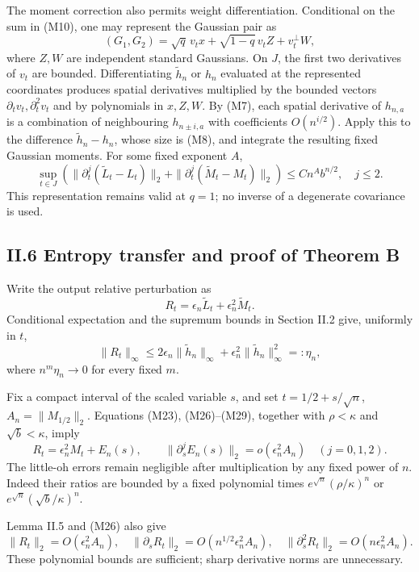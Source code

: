 \documentclass[
  british,
  10pt,
]{article}
\begin{document}
The moment correction also permits weight differentiation. Conditional
on the sum in (M10), one may represent the Gaussian pair as \[
(G_1,G_2)=
\sqrt q\,v_t x+\sqrt{1-q}\,v_t Z+v_t^\perp W,
\] where \(Z,W\) are independent standard Gaussians. On \(J\), the first
two derivatives of \(v_t\) are bounded. Differentiating
\(\widetilde h_n\) or \(h_n\) evaluated at the represented coordinates
produces spatial derivatives multiplied by the bounded vectors
\(\partial_tv_t,\partial_t^2v_t\) and by polynomials in \(x,Z,W\). By
(M7), each spatial derivative of \(h_{n,a}\) is a combination of
neighbouring \(h_{n\pm i,a}\) with coefficients \(O(n^{i/2})\). Apply
this to the difference \(\widetilde h_n-h_n\), whose size is (M8), and
integrate the resulting fixed Gaussian moments. For some fixed exponent
\(A\), \[
\sup_{t\in J}
\left(
\|\partial_t^j(\widetilde L_t-L_t)\|_2+
\|\partial_t^j(\widetilde M_t-M_t)\|_2
\right)
\le C n^A b^{n/2},
\quad j\le2.
\tag{M29}
\] This representation remains valid at \(q=1\); no inverse of a
degenerate covariance is used.

\subsection{II.6 Entropy transfer and proof of Theorem
B}\label{ii.6-entropy-transfer-and-proof-of-theorem-b}

Write the output relative perturbation as \[
R_t=\epsilon_n\widetilde L_t+\epsilon_n^2\widetilde M_t.
\] Conditional expectation and the supremum bounds in Section II.2 give,
uniformly in \(t\), \[
\|R_t\|_\infty\le
2\epsilon_n\|\widetilde h_n\|_\infty
+\epsilon_n^2\|\widetilde h_n\|_\infty^2
=:\eta_n,
\tag{M30}
\] where \(n^m\eta_n\to0\) for every fixed \(m\).

Fix a compact interval of the scaled variable \(s\), and set
\(t=1/2+s/\sqrt n\), \(A_n=\|M_{1/2}\|_2\). Equations (M23),
(M26)--(M29), together with \(\rho<\kappa\) and \(\sqrt b<\kappa\),
imply \[
R_t=\epsilon_n^2M_t+E_n(s),\qquad
\|\partial_s^jE_n(s)\|_2=o(\epsilon_n^2A_n)
\quad(j=0,1,2).
\tag{M31}
\] The little-oh errors remain negligible after multiplication by any
fixed power of \(n\). Indeed their ratios are bounded by a fixed
polynomial times \(e^{\sqrt n}(\rho/\kappa)^n\) or
\(e^{\sqrt n}(\sqrt b/\kappa)^n\).

Lemma II.5 and (M26) also give \[
\|R_t\|_2=O(\epsilon_n^2A_n),\quad
\|\partial_sR_t\|_2=O(n^{1/2}\epsilon_n^2A_n),\quad
\|\partial_s^2R_t\|_2=O(n\epsilon_n^2A_n).
\tag{M32}
\] These polynomial bounds are sufficient; sharp derivative norms are
unnecessary.
\end{document}
